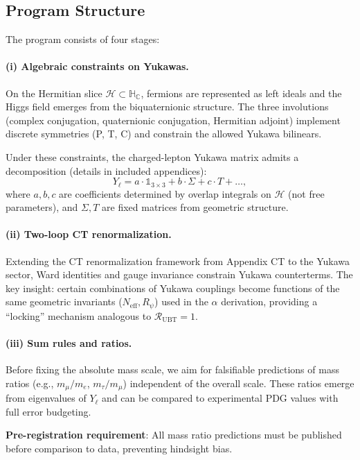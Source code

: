 \documentclass[11pt,a4paper]{article}
\begin{document}
\subsection{Program Structure}

The program consists of four stages:

\paragraph{(i) Algebraic constraints on Yukawas.}
On the Hermitian slice $\mathcal{H} \subset \mathbb{H}_{\mathbb{C}}$, fermions are represented as left ideals and the Higgs field emerges from the biquaternionic structure. The three involutions (complex conjugation, quaternionic conjugation, Hermitian adjoint) implement discrete symmetries (P, T, C) and constrain the allowed Yukawa bilinears.

Under these constraints, the charged-lepton Yukawa matrix admits a decomposition (details in included appendices):
\[
Y_\ell = a \cdot \mathbb{1}_{3\times 3} + b \cdot \Sigma + c \cdot T + \ldots,
\]
where $a, b, c$ are coefficients determined by overlap integrals on $\mathcal{H}$ (not free parameters), and $\Sigma, T$ are fixed matrices from geometric structure.

\paragraph{(ii) Two-loop CT renormalization.}
Extending the CT renormalization framework from Appendix CT to the Yukawa sector, Ward identities and gauge invariance constrain Yukawa counterterms. The key insight: certain combinations of Yukawa couplings become functions of the same geometric invariants ($N_{\mathrm{eff}}, R_\psi$) used in the $\alpha$ derivation, providing a ``locking'' mechanism analogous to $\mathcal{R}_{\mathrm{UBT}} = 1$.

\paragraph{(iii) Sum rules and ratios.}
Before fixing the absolute mass scale, we aim for falsifiable predictions of mass ratios (e.g., $m_\mu/m_e$, $m_\tau/m_\mu$) independent of the overall scale. These ratios emerge from eigenvalues of $Y_\ell$ and can be compared to experimental PDG values with full error budgeting.

\textbf{Pre-registration requirement}: All mass ratio predictions must be published before comparison to data, preventing hindsight bias.
\end{document}
